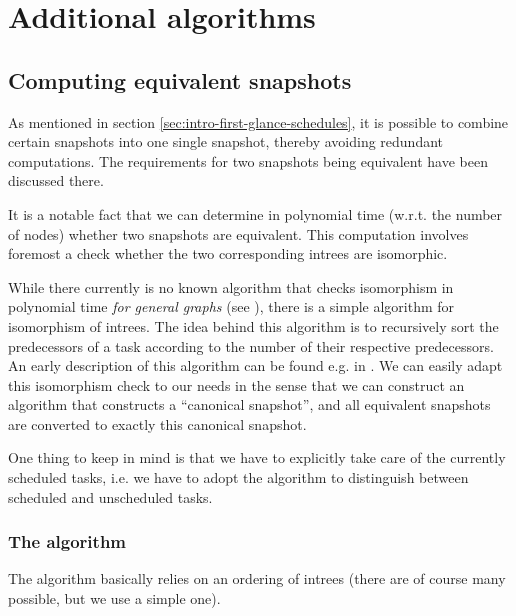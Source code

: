 \chapter{Additional algorithms}
\label{sec:additional-algs}

\newcommand{\treegeq}[1][X]{\stackrel{\text{#1}}{\geq}}

\section{Computing equivalent snapshots}
\label{sec:algorithm-equivalent-snapshot}

As mentioned in section \ref{sec:intro-first-glance-schedules}, it is possible to combine certain snapshots into one single snapshot, thereby avoiding redundant computations. The requirements for two snapshots being equivalent have been discussed there.

It is a notable fact that we can determine in polynomial time (w.r.t. the number of nodes) whether two snapshots are equivalent. This computation involves foremost a check whether the two corresponding intrees are isomorphic. 


While there currently is no known algorithm that checks isomorphism in polynomial time \emph{for general graphs} (see \cite{arora2009computational}), there is a simple algorithm for isomorphism of intrees. The idea behind this algorithm is to recursively sort the predecessors of a task according to the number of their respective predecessors. An early description of this algorithm can be found e.g. in \cite{aho1974design}. We can easily adapt this isomorphism check to our needs in the sense that we can construct an algorithm that constructs a ``canonical snapshot'', and all equivalent snapshots are converted to exactly this canonical snapshot.

One thing to keep in mind is that we have to explicitly take care of the currently scheduled tasks, i.e. we have to adopt the algorithm to distinguish between scheduled and unscheduled tasks.

\subsection{The algorithm}
\label{sec:algorithm-equiv-snapshots-actual-algo}

The algorithm basically relies on an ordering of intrees (there are of course many possible, but we use a simple one).


